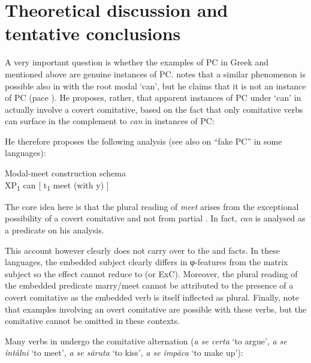\documentclass[output=paper]{langsci/langscibook}
\begin{document}
\section{Theoretical discussion and tentative conclusions}\label{sec:24.5}

A very important question is whether the examples of
\gls{PC} in Greek and  mentioned above are
genuine instances of PC. \citet{Poole2015} notes that a similar phenomenon is
possible also in  with the root modal ‘can’, but he claims that it is
not an instance of \gls{PC} (pace
\citealt{Rodrigues2007}). He proposes, rather, that apparent instances of
\gls{PC} under ‘can’ in  actually involve a
covert comitative, based on the fact that only comitative verbs can surface in
the complement to \emph{can} in instances of \gls{PC}:\largerpage

\ea%
    \label{ex:24.40} \textcite[14]{Poole2015}
	\z
\z

He therefore proposes the following analysis (see also \citealt{Sheehan2014c} on
\enquote{fake \gls{PC}} in some  languages):

\ea\label{ex:24.41} Modal-meet construction schema \parencite[15]{Poole2015}\\%
    XP\textsubscript{1} can [ t\textsubscript{1} meet (with y) ]
\z

The core idea here is that the plural reading of \emph{meet} arises from the
exceptional possibility of a covert comitative and not from partial . In
fact, \emph{can} is analysed as a  predicate on his
analysis.

This account however clearly does not carry over to the  and
 facts. In these languages, the embedded subject clearly differs in φ-features
from the matrix subject so the effect cannot reduce to  (or \gls{ExC}).
Moreover, the plural reading of the embedded predicate marry/meet cannot be
attributed to the presence of a covert comitative as the embedded verb is
itself inflected as plural. Finally, note that examples involving an overt
comitative are possible with these verbs, but the comitative cannot be omitted
in these contexts.

Many verbs in  undergo the comitative alternation (\emph{a se certa}
‘to argue’, \emph{a se întâlni} ‘to meet’, \emph{a se săruta} ‘to kiss’,
\emph{a se împăca} ‘to make up’):
\end{document}
